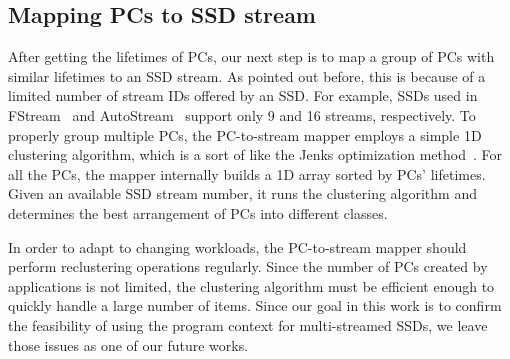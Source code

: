 \vspace{-5pt}
\subsection{Mapping PCs to SSD stream}
After getting the lifetimes of PCs, our next step is to map a group of PCs with
similar lifetimes to an SSD stream. As pointed out before, this is because of a
limited number of stream IDs offered by an SSD. For example, SSDs used in 
FStream~\cite{FStream} and AutoStream~\cite{AutoStream} support only 9 and 16
streams, respectively. To properly group multiple PCs, the PC-to-stream mapper
employs a simple 1D clustering algorithm, which is a sort of like the Jenks
optimization method~\cite{Jenks}.  For all the PCs, the mapper internally builds a
1D array sorted by PCs' lifetimes.  Given an available SSD stream number, it
runs the clustering algorithm and determines the best arrangement of PCs into
different classes.

In order to adapt to changing workloads, the PC-to-stream mapper should perform
reclustering operations regularly. Since the number of PCs created by
applications is not limited, the clustering algorithm must be efficient enough
to quickly handle a large number of items. Since our goal in this work is to
confirm the feasibility of using the program context for multi-streamed SSDs,
we leave those issues as one of our future works.


\vspace{-5pt}
